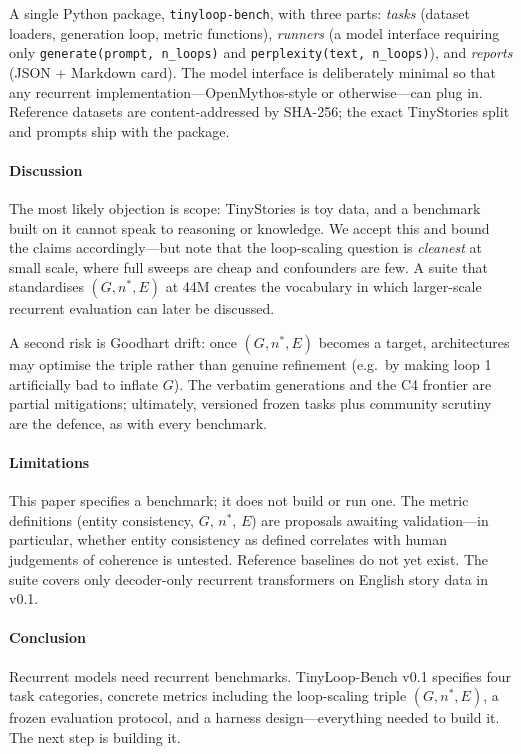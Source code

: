 A single Python package, \texttt{tinyloop-bench}, with three parts:
\emph{tasks} (dataset loaders, generation loop, metric functions),
\emph{runners} (a model interface requiring only
\texttt{generate(prompt, n\_loops)} and \texttt{perplexity(text,
n\_loops)}), and \emph{reports} (JSON + Markdown card). The model
interface is deliberately minimal so that any recurrent
implementation---OpenMythos-style \citep{gomez2024openmythos} or
otherwise---can plug in. Reference datasets are content-addressed by
SHA-256; the exact TinyStories split and prompts ship with the
package.

\paragraph{Discussion}

The most likely objection is scope: TinyStories is toy data, and a
benchmark built on it cannot speak to reasoning or knowledge. We
accept this and bound the claims accordingly---but note that the
loop-scaling question is \emph{cleanest} at small scale, where full
sweeps are cheap and confounders are few. A suite that standardises
$(G, n^*, E)$ at 44M creates the vocabulary in which larger-scale
recurrent evaluation can later be discussed.

A second risk is Goodhart drift: once $(G, n^*, E)$ becomes a target,
architectures may optimise the triple rather than genuine refinement
(e.g.\ by making loop 1 artificially bad to inflate $G$). The
verbatim generations and the C4 frontier are partial mitigations;
ultimately, versioned frozen tasks plus community scrutiny are the
defence, as with every benchmark.

\paragraph{Limitations}

This paper specifies a benchmark; it does not build or run one. The
metric definitions (entity consistency, $G$, $n^*$, $E$) are
proposals awaiting validation---in particular, whether entity
consistency as defined correlates with human judgements of coherence
is untested. Reference baselines do not yet exist. The suite covers
only decoder-only recurrent transformers on English story data in
v0.1.

\paragraph{Conclusion}

Recurrent models need recurrent benchmarks. TinyLoop-Bench v0.1
specifies four task categories, concrete metrics including the
loop-scaling triple $(G, n^*, E)$, a frozen evaluation protocol, and
a harness design---everything needed to build it. The next step is
building it.
